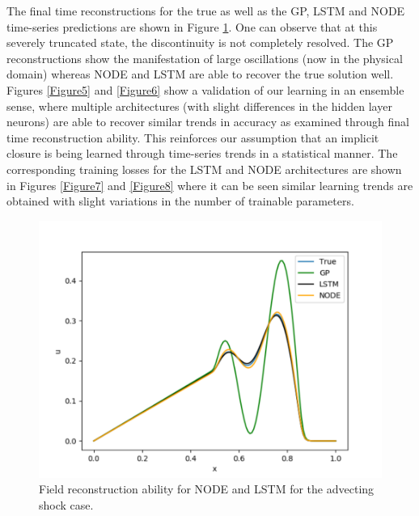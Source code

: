 \documentclass[preprint,12pt]{elsarticle}
\begin{document}
The final time reconstructions for the true as well as the GP, LSTM and NODE time-series predictions are shown in Figure \ref{Figure4}. One can observe that at this severely truncated state, the discontinuity is not completely resolved. The GP reconstructions show the manifestation of large oscillations (now in the physical domain) whereas NODE and LSTM are able to recover the true solution well. Figures \ref{Figure5} and \ref{Figure6} show a validation of our learning in an ensemble sense, where multiple architectures (with slight differences in the hidden layer neurons) are able to recover similar trends in accuracy as examined through final time reconstruction ability. This reinforces our assumption that an implicit closure is being learned through time-series trends in a statistical manner. The corresponding training losses for the LSTM and NODE architectures are shown in Figures \ref{Figure7} and \ref{Figure8} where it can be seen similar learning trends are obtained with slight variations in the number of trainable parameters. 

\begin{figure}
	\centering
	\includegraphics[width=\textwidth]{Figure_5.pdf}
	\caption{Field reconstruction ability for NODE and LSTM for the advecting shock case.}
	\label{Figure4}
\end{figure}
\end{document}
